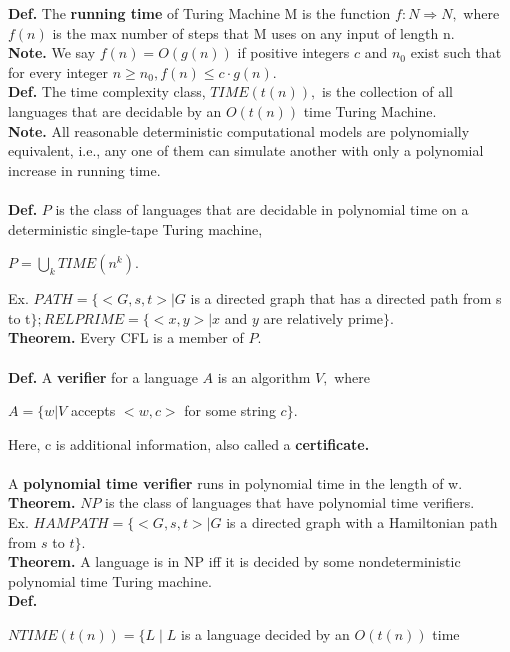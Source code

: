 \documentclass[12pt]{article}
\begin{document}
\begin{multicols}{2}
\noindent\textbf{Def.} The \textbf{running time} of Turing Machine M is the function $f:N \Rightarrow N,$ where $f(n)$ is the max number of steps that M uses on any input of length n.
\\
\textbf{Note.} We say $f(n) = O(g(n))$ if positive integers $c$ and $n_{0}$ exist such that for every integer $n \geq n_{0}, f(n) \leq c \cdot g(n).$
\\
\textbf{Def.} The time complexity class, $TIME(t(n)),$ is the collection of all languages that are decidable by an $O(t(n))$ time Turing Machine.
\\
\textbf{Note.} All reasonable deterministic computational models are polynomially equivalent, i.e., any one of them can simulate another with only a polynomial increase in running time.
\\\\
\textbf{Def.} $P$ is the class of languages that are decidable in polynomial time on a deterministic single-tape Turing machine,
\begin{center}
$P = \bigcup\limits_{k}TIME(n^{k}).$
\end{center}
Ex. $PATH = \lbrace<G, s, t> | G$ is a directed graph that has a directed path from s to t$\rbrace; RELPRIME = \lbrace<x, y>| x$ and $y$ are relatively prime$\rbrace.$
\\
\textbf{Theorem.} Every CFL is a member of $P$.
\\\\
\textbf{Def.} A \textbf{verifier} for a language $A$ is an algorithm $V,$ where
\begin{center}
$A = \lbrace w | V$ accepts $<w, c>$ for some string $c \rbrace.$
\end{center}
Here, c is additional information, also called a \textbf{certificate.}\\\\
A \textbf{polynomial time verifier} runs in polynomial time in the length of w.\\
\textbf{Theorem.} $NP$ is the class of languages that have polynomial time verifiers.\\
Ex. $HAMPATH = \lbrace <G,s,t> \mid G$ is a directed graph with a Hamiltonian path from $s$ to $t \rbrace.$\\
\textbf{Theorem.} A language is in NP iff it is decided by some nondeterministic polynomial time Turing machine.\\
\textbf{Def.}
\begin{center}
$NTIME(t(n)) = \lbrace L \mid L$ is a language decided by an $O(t(n))$ time

\end{center}
\end{multicols}
\end{document}
